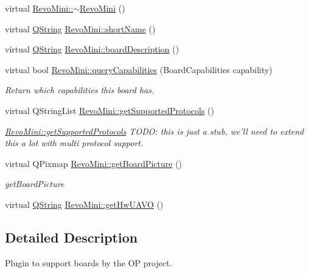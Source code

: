 \begin{DoxyCompactItemize}
virtual \hyperlink{group___boards___open_pilot_plugin_ga6e4458ca98fbe0ed1501b324c934af47}{Revo\-Mini\-::$\sim$\-Revo\-Mini} ()
\item 
virtual \hyperlink{group___u_a_v_objects_plugin_gab9d252f49c333c94a72f97ce3105a32d}{Q\-String} \hyperlink{group___boards___open_pilot_plugin_ga927253b30c15894799a8f99f632aec03}{Revo\-Mini\-::short\-Name} ()
\item 
virtual \hyperlink{group___u_a_v_objects_plugin_gab9d252f49c333c94a72f97ce3105a32d}{Q\-String} \hyperlink{group___boards___open_pilot_plugin_ga721fb37ca43a4eaa930682025c96b24d}{Revo\-Mini\-::board\-Description} ()
\item 
virtual bool \hyperlink{group___boards___open_pilot_plugin_ga5bf154e46cfe882c67dd2e851b4195c7}{Revo\-Mini\-::query\-Capabilities} (Board\-Capabilities capability)
\begin{DoxyCompactList}\small\item\em Return which capabilities this board has. \end{DoxyCompactList}\item 
virtual Q\-String\-List \hyperlink{group___boards___open_pilot_plugin_gaf820a526d814e3f0d11e403bc2c89f60}{Revo\-Mini\-::get\-Supported\-Protocols} ()
\begin{DoxyCompactList}\small\item\em \hyperlink{group___boards___open_pilot_plugin_gaf820a526d814e3f0d11e403bc2c89f60}{Revo\-Mini\-::get\-Supported\-Protocols} T\-O\-D\-O\-: this is just a stub, we'll need to extend this a lot with multi protocol support. \end{DoxyCompactList}\item 
virtual Q\-Pixmap \hyperlink{group___boards___open_pilot_plugin_ga63ad5a29a4010dcb3e00f6e0383e741f}{Revo\-Mini\-::get\-Board\-Picture} ()
\begin{DoxyCompactList}\small\item\em get\-Board\-Picture \end{DoxyCompactList}\item 
virtual \hyperlink{group___u_a_v_objects_plugin_gab9d252f49c333c94a72f97ce3105a32d}{Q\-String} \hyperlink{group___boards___open_pilot_plugin_gae959e2f2bea464d785957b6198a8c9c9}{Revo\-Mini\-::get\-Hw\-U\-A\-V\-O} ()
\end{DoxyCompactItemize}


\subsection{Detailed Description}
Plugin to support boards by the O\-P project. 

